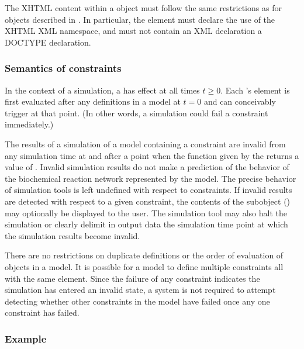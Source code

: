 The XHTML content within a \Message object must follow the same
restrictions as for \Notes objects described in
.  In particular, the element must declare
the use of the XHTML XML namespace, and must not contain an XML
declaration  a DOCTYPE declaration.


\subsubsection{Semantics of constraints}
\label{sec:constraint-semantics}

In the context of a simulation, a \Constraint has effect at all
times $t \geq 0$.  Each \Constraint's  element is first
evaluated after any \InitialAssignment definitions in a model at
$t = 0$ and can conceivably trigger at that point.  (In other
words, a simulation could fail a constraint immediately.)



The results of a simulation of a model containing a constraint are
invalid from any simulation time at and after a point when the
function given by the  returns a value of .
Invalid simulation results do not make a prediction of the
behavior of the biochemical reaction network represented by the
model.  The precise behavior of simulation tools is left undefined
with respect to constraints.  If invalid results are detected with
respect to a given constraint, the contents of the \Message
subobject () may optionally be
displayed to the user.  The simulation tool may also halt the
simulation or clearly delimit in output data the simulation time
point at which the simulation results become invalid.

There are no restrictions on duplicate \Constraint
definitions or the order of evaluation of \Constraint objects in a
model.  It is possible for a model to define multiple constraints
all with the same  element.  Since the failure of any
constraint indicates the simulation has entered an invalid state,
a system is not required to attempt detecting whether
other constraints in the model have failed once any one constraint
has failed.


\subsubsection{Example}

